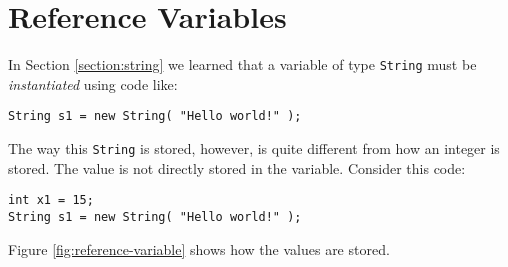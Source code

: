 
\chapter{Reference Variables}
\label{chapter:reference-variables}

In Section \ref{section:string} we learned that a variable of type \texttt{String} must be \textit{instantiated} using code like:

\begin{verbatim}
String s1 = new String( "Hello world!" );
\end{verbatim}

The way this \texttt{String} is stored, however, is quite different from how an integer is stored.  The value is not directly stored in the variable.  Consider this code:

\begin{verbatim}
int x1 = 15;
String s1 = new String( "Hello world!" );
\end{verbatim}

Figure \ref{fig:reference-variable} shows how the values are stored.

